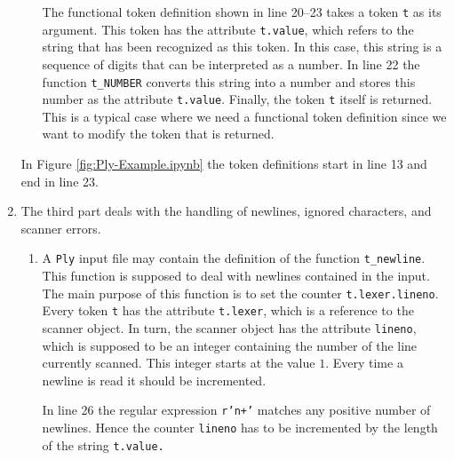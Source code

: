 \begin{enumerate}
\begin{enumerate}
            The functional token definition shown in line 20--23 takes a token \texttt{t} as its
            argument.  This token has the attribute \texttt{t.value}, which refers to the string that has been
            recognized as this token.  In this case, this string is a sequence of digits that can be
            interpreted as a number.  In line 22 the function  \texttt{t\_NUMBER} converts this string into a
            number and stores this number as the attribute \texttt{t.value}.  Finally, the token \texttt{t}
            itself is returned.  This is a typical case where we need a functional token definition since we 
            want to modify the token that is returned.
      \end{enumerate}
      In Figure \ref{fig:Ply-Example.ipynb} the token definitions start in line 13 and end in line 23.
\item The third part deals with the handling of newlines, ignored characters, and scanner errors.
  \begin{enumerate}
  \item A \texttt{Ply} input file may contain the definition of the function \texttt{t\_newline}.
        This function is supposed to deal with newlines contained in the input.  The main purpose of this
        function is to set the  
        counter \texttt{t.lexer.lineno}.  Every token \texttt{t} has the attribute \texttt{t.lexer}, which is a
        reference to the scanner object.  In turn, the scanner object has the attribute \texttt{lineno}, which
        is supposed to be an integer containing the number of the line currently scanned.  This integer starts
        at the value $1$.  Every time a newline is read it should be incremented.

        In line 26 the regular expression \texttt{r'n+'} matches any positive number of newlines.
        Hence the counter \texttt{lineno} has to be incremented by the length of the string \texttt{t.value.}


\end{enumerate}
\end{enumerate}
